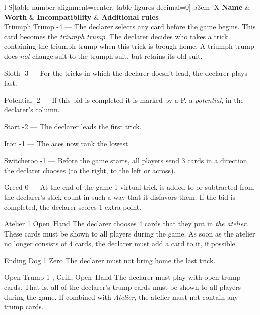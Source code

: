 \begin{table}
	\caption{Special bids}\label{tab:specialBids}
	\begin{center}
		\begin{tabularx}{\textwidth}{
			l
			S[table-number-alignment=center, table-figures-decimal=0]
			p{3cm}
			|X
		}
			\textbf{Name} &
			\textbf{Worth} &
			\textbf{Incompatibility} &
			\textbf{Additional rules}
			\\[-3ex]

			\specialBidItem%
			{Triumph Trump}
			{-4}
			{---}
			{%
				The declarer selects any card before the game begins. This card becomes the \emph{triumph trump}. The declarer decides who takes a trick containing the triumph trump when this trick is brough home. A triumph trump does \emph{not} change suit to the trumph suit, but retains its old suit.
			}

			\specialBidItem%
			{Sloth}
			{-3}
			{---}
			{%
				For the tricks in which the declarer doesn't lead, the declarer plays last.
			}

			\specialBidItem%
			{Potential}
			{-2}
			{---}
			{%
				If this bid is completed it is marked by a P, a \emph{potential}, in the declarer's column.
			}

			\specialBidItem%
			{Start}
			{-2}
			{---}
			{%
				The declarer leads the first trick.
			}

			\specialBidItem%
			{Iron}
			{-1}
			{---}
			{%
				The aces now rank the lowest.
			}

			\specialBidItem%
			{Switcheroo}
			{-1}
			{---}
			{%
				Before the game starts, all players send 3 cards in a direction the declarer chooses (to the right, to the left or across).
			}

			\specialBidItem%
			{Greed}
			{0}
			{---}
			{%
				At the end of the game 1 virtual trick is added to or subtracted from the declarer's stick count in such a way that it disfavors them. If the bid is completed, the declarer scores 1 extra point.
			}

			\specialBidItem%
			{Atelier}
			{1}
			{Open~Hand}
			{%
				The declarer chooses 4 cards that they put in \emph{the atelier}. These cards must be shown to all players during the game. As soon as the atelier no longer consists of 4 cards, the declarer must add a card to it, if possible.
			}

			\specialBidItem%
			{Ending Dog}
			{1}
			{Zero}
			{%
				The declarer must not bring home the last trick.
			}

			\specialBidItem%
			{Open Trump}
			{1}
			{\nonTrump, Grill, Open~Hand}
			{%
				The declarer must play with open trump cards. That is, all of the declarer’s trump cards must be shown to all players during the game. If combined with \emph{Atelier}, the atelier must not contain any trump cards.
			}


\end{tabularx}
\end{center}
\end{table}
